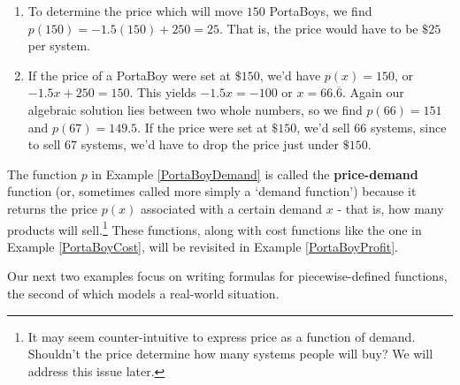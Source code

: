 \documentclass{ximera}
\begin{document}
\begin{example}
\begin{explanation}
\begin{enumerate}
\item  To determine the price which will move $150$ PortaBoys, we find $p(150) = -1.5(150) + 250 = 25$.  That is, the price would have to be $\$25$ per system.

\item  If the price of a PortaBoy were set at $\$150$, we'd have $p(x) = 150$, or $-1.5x + 250 = 150$.  This yields $-1.5x = -100$ or $x = 66.\overline{6}$. Again our algebraic solution lies between two whole numbers, so we find $p(66) = 151$ and $p(67) = 149.5$.  If the price were set at $\$ 150$, we'd sell $66$ systems, since to sell $67$ systems, we'd have to drop the price just under $\$150$.  

\end{enumerate}
\end{explanation}

\end{example}

The function $p$ in Example \ref{PortaBoyDemand} is called the \textbf{price-demand} function (or, sometimes called more simply a `demand function') because it returns the price $p(x)$ associated with a certain demand $x$ - that is, how many products will sell.\footnote{It may seem counter-intuitive to express price as a function of demand.  Shouldn't the price determine how many systems people will buy?  We will address this issue later.}  These functions, along with cost functions like the one in Example \ref{PortaBoyCost}, will be revisited in Example \ref{PortaBoyProfit}.



Our next two examples focus on writing formulas for piecewise-defined functions, the second of which models a real-world situation.
\end{document}
